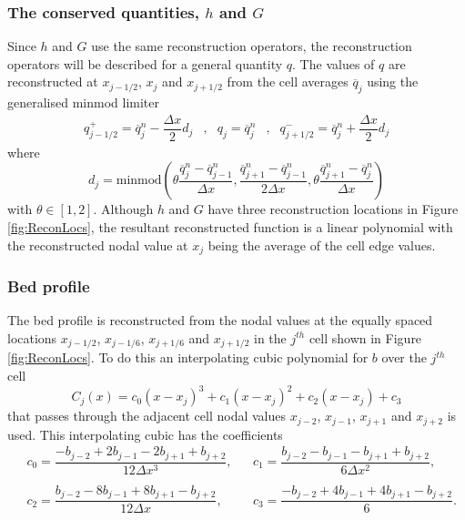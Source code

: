 \documentclass[times]{elsarticle}
\begin{document}
\subsubsection{The conserved quantities, $h$ and $G$ }
Since $h$ and $G$ use the same reconstruction operators, the reconstruction operators will be described for a general quantity $q$. The values of $q$ are reconstructed at $x_{j-1/2} $, $x_{j} $ and $x_{j+1/2}$ from the cell averages $\overline{q}_j$ using the generalised minmod limiter \cite{VanLeer-1979-101}
	\begin{align}
	q^+_{j-1/2} = \overline{q}^n_j - \dfrac{\Delta x}{2} d_j &,&
	q_{j}  =\overline{q}^n_j &,&
	q^-_{j+1/2}  = \overline{q}^n_j + \dfrac{\Delta x}{2} d_j
		\label{eqn:ReconforhwG}
	\end{align}
where 
\begin{equation}
d_j = \text{minmod}\left(\theta \dfrac{\overline{q}^n_j -\overline{q}^n_{j-1} }{\Delta x}, \dfrac{\overline{q}^n_{j+1} -\overline{q}^n_{j-1} }{2\Delta x}, \theta\dfrac{\overline{q}^n_{j+1} -\overline{q}^n_{j} }{\Delta x}\right)
\label{eqn:slopehGrecon}
\end{equation}
with $\theta \in \left[1,2\right]$. Although $h$ and $G$ have three reconstruction locations in Figure \ref{fig:ReconLocs}, the resultant reconstructed function is a linear polynomial with the reconstructed nodal value at $x_j$ being the average of the cell edge values. 

\subsubsection{Bed profile }
The bed profile is reconstructed from the nodal values at the equally spaced locations $x_{j-1/2}$, $x_{j-1/6}$, $x_{j+1/6}$ and $x_{j+1/2}$ in the $j^{th}$ cell shown in Figure \ref{fig:ReconLocs}. To do this an interpolating cubic polynomial for $b$ over the $j^{th}$ cell 
\begin{equation*}
C_j(x) = c_0 \left(x - x_j\right)^3 + c_1 \left(x - x_j\right)^2 + c_2 \left(x - x_j\right) + c_3
\label{eqn:cubicforbedrecon}
\end{equation*}
that passes through the adjacent cell nodal values $x_{j-2}$, $x_{j-1}$, $x_{j+1}$ and $x_{j+2}$ is used. This interpolating cubic has the coefficients
\begin{align*}
&c_0 =  \dfrac{-b_{j-2} + 2b_{j-1} - 2 b_{j+1} + b_{j+2}}{12 \Delta x^3}, & &
c_1 =  \dfrac{b_{j-2} - b_{j-1} - b_{j+1} + b_{j+2}}{6 \Delta x^2},\\ \\
&c_2 =  \dfrac{b_{j-2} - 8b_{j-1} + 8 b_{j+1} - b_{j+2}}{12 \Delta x},& &
c_3 =  \dfrac{-b_{j-2}  + 4b_{j-1} + 4 b_{j+1} - b_{j+2}}{6}.
\end{align*}
\end{document}
